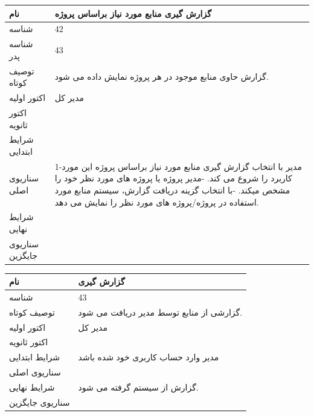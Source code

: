 \vspace{2cm}

\begin{tabular}{|p{2cm}|p{10cm}|}
\hline
نام
&
گزارش گیری منابع مورد نیاز براساس پروژه
\\
\hline
شناسه
&
42
\\
\hline
شناسه پدر
&
43
\\
\hline
توصیف کوتاه
&
گزارش حاوی منابع موجود در هر پروژه نمایش داده می شود.
\\
\hline
اکتور اولیه
&
مدیر کل
\\
\hline
اکتور ثانویه
&

\\
\hline
شرایط ابتدایی
&

\\
\hline
سناریوی اصلی
&
1-مدیر با انتخاب گزارش گیری منابع مورد نیاز براساس پروژه این مورد کاربرد را شروع می کند.
\newline
2-مدیر پروژه یا پروژه های مورد نظر خود را مشخص میکند. 
\newline
3-با انتخاب گزینه دریافت گزارش، سیستم  منابع مورد استفاده در پروژه/پروژه های مورد نظر را نمایش می دهد. 

\\
\hline
شرایط نهایی
&

\\
\hline
سناریوی جایگزین
&

\\
\hline
\end{tabular}

\vspace{2cm}

\begin{tabular}{|p{2cm}|p{10cm}|}
\hline
نام
&
گزارش گیری
\\
\hline
شناسه
&
43
\\
\hline
توصیف کوتاه
&
گزارشی از منابع توسط مدیر دریافت می شود.
\\
\hline
اکتور اولیه
&
مدیر کل 
\\
\hline
اکتور ثانویه
&

\\
\hline
شرایط ابتدایی
&
مدیر وارد حساب کاربری خود شده باشد
\\
\hline
سناریوی اصلی
&

\\
\hline
شرایط نهایی
&
گزارش از سیستم گرفته می شود.
\\
\hline
سناریوی جایگزین
&

\\
\hline
\end{tabular}




